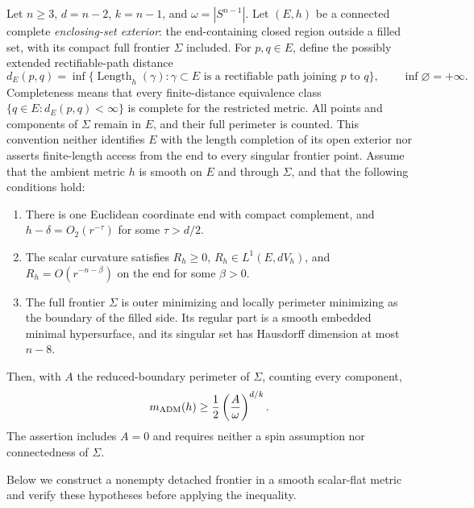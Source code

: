 \begin{theorem}
\label{thm:riemannian-input}
Let $n\ge3$, $d=n-2$, $k=n-1$, and $\omega=|S^{n-1}|$.
Let $(E,h)$ be a connected complete \emph{enclosing-set exterior}:
the end-containing closed region outside a filled set, with its
compact full frontier $\Sigma$ included.  For $p,q\in E$, define the
possibly extended rectifiable-path distance
\[
 d_E(p,q)=\inf\{\operatorname{Length}_h(\gamma):
       \gamma\subset E\text{ is a rectifiable path joining }p\text{ to }q\},
 \qquad \inf\varnothing=+\infty.
\]
Completeness means that every finite-distance equivalence class
$\{q\in E:d_E(p,q)<\infty\}$ is complete for the restricted metric.
All points and components of $\Sigma$ remain in $E$, and their full
perimeter is counted.  This convention neither identifies $E$ with
the length completion of its open exterior nor asserts finite-length
access from the end to every singular frontier point.
Assume that the ambient metric $h$ is smooth on $E$ and through
$\Sigma$, and that the following conditions hold:
\begin{enumerate}
\item There is one Euclidean coordinate end with compact complement,
      and $h-\delta=O_2(r^{-\tau})$ for some $\tau>d/2$.
\item The scalar curvature satisfies $R_h\ge0$,
      $R_h\in L^1(E,dV_h)$, and $R_h=O(r^{-n-\beta})$ on the end
      for some $\beta>0$.
\item The full frontier $\Sigma$ is outer minimizing and locally
      perimeter minimizing as the boundary of the filled side.
      Its regular part is a smooth embedded minimal hypersurface,
      and its singular set has Hausdorff dimension at most $n-8$.
\end{enumerate}
Then, with $A$ the reduced-boundary perimeter of $\Sigma$, counting
every component,
\[
 m_{\rm ADM}(h)\ge \frac12\left(\frac{A}{\omega}\right)^{d/k}.
\]
The assertion includes $A=0$ and requires neither a spin assumption
nor connectedness of $\Sigma$.
\end{theorem}

Below we construct a nonempty detached
frontier in a smooth scalar-flat metric and verify these hypotheses
before applying the inequality.

